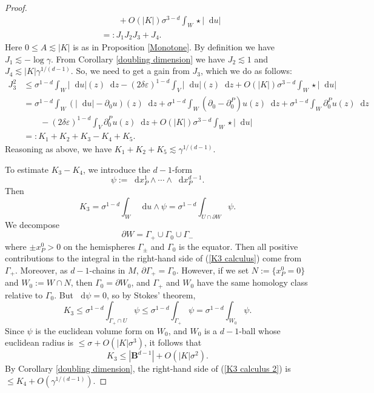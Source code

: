 \documentclass[reqno,11pt]{amsart}
\newcommand{\Ball}{\mathbf{B}}
\newcommand*\dif{\mathop{}\!\mathrm{d}}
\theoremstyle{definition}
\numberwithin{equation}{section}
\begin{document}
\begin{proof}
\begin{align*}
&\qquad + O(|K|) \sigma^{3 - d} \int_W \star |\dif u| \\
&=: J_1 J_2 J_3 + J_4.
\end{align*}
Here $0 \leq A \lesssim |K|$ is as in Proposition \ref{Monotone}.
By definition we have $J_1 \lesssim -\log \gamma$.
From Corollary \ref{doubling dimension} we have $J_2 \lesssim 1$ and $J_4 \lesssim |K| \gamma^{1/(d - 1)}$.
So, we need to get a gain from $J_3$, which we do as follows:
\begin{align*}
J_3^2 &\leq \sigma^{1 - d} \int_W |\dif u|(z) \dif z - (2 \delta \varepsilon)^{1 - d} \int_V |\dif u|(z) \dif z + O(|K|) \sigma^{3 - d} \int_W \star |\dif u| \\
&= \sigma^{1 - d} \int_W (|\dif u| - \partial_0 u)(z) \dif z + \sigma^{1 - d} \int_W (\partial_0 - \partial_0^P)u(z) \dif z + \sigma^{1 - d} \int_W \partial_0^Pu(z) \dif z \\
&\qquad - (2 \delta\varepsilon)^{1 - d} \int_V \partial_0^P u(z) \dif z + O(|K|) \sigma^{3 - d} \int_W \star |\dif u| \\
&=: K_1 + K_2 + K_3 - K_4 + K_5.
\end{align*}
Reasoning as above, we have $K_1 + K_2 + K_5 \lesssim \gamma^{1/(d - 1)}$.

To estimate $K_3 - K_4$, we introduce the $d - 1$-form
$$\psi := \dif x^1_P \wedge \cdots \wedge \dif x^{d - 1}_P.$$
Then
\begin{equation}\label{K3 calculus}
K_3 = \sigma^{1 - d} \int_W \dif u \wedge \psi = \sigma^{1 - d} \int_{U \cap \partial W} \psi.
\end{equation}
We decompose
$$\partial W = \Gamma_+ \cup \Gamma_0 \cup \Gamma_-$$
where $\pm x^0_P > 0$ on the hemispheres $\Gamma_\pm$ and $\Gamma_0$ is the equator.
Then all positive contributions to the integral in the right-hand side of (\ref{K3 calculus}) come from $\Gamma_+$.
Moreover, as $d-1$-chains in $M$, $\partial \Gamma_+ = \Gamma_0$.
However, if we set $N := \{x^0_P = 0\}$ and $W_0 := W \cap N$, then $\Gamma_0 = \partial W_0$, and $\Gamma_+$ and $W_0$ have the same homology class relative to $\Gamma_0$.
But $\dif \psi = 0$, so by Stokes' theorem,
$$K_3 \leq \sigma^{1 - d} \int_{\Gamma_+ \cap U} \psi \leq \sigma^{1 - d} \int_{\Gamma_+} \psi = \sigma^{1 - d} \int_{W_0} \psi.$$
Since $\psi$ is the euclidean volume form on $W_0$, and $W_0$ is a $d-1$-ball whose euclidean radius is $\leq \sigma + O(|K| \sigma^3)$, it follows that 
\begin{equation}\label{K3 calculus 2}
K_3 \leq |\Ball^{d - 1}| + O(|K| \sigma^2).
\end{equation}
By Corollary \ref{doubling dimension}, the right-hand side of (\ref{K3 calculus 2}) is $\leq K_4 + O(\gamma^{1/(d - 1)})$.


\end{proof}
\end{document}

